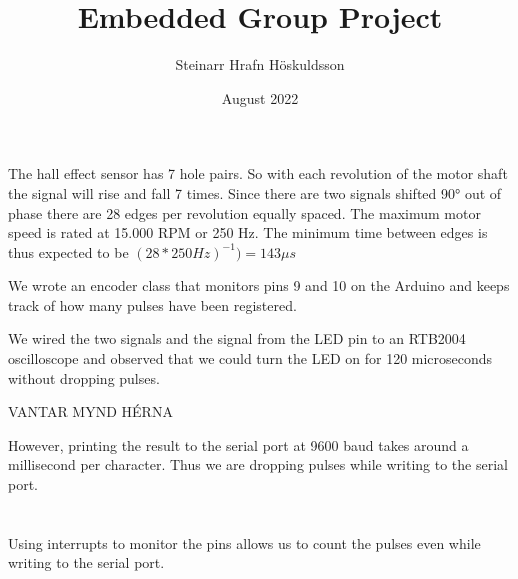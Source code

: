 \documentclass{article}
\title{Embedded Group Project}
\author{Steinarr Hrafn Höskuldsson}
\date{August 2022}
\begin{document}
\maketitle

\section{}
The hall effect sensor has 7 hole pairs. So with each revolution of the motor shaft the signal will rise and fall 7 times. Since there are two signals shifted 90° out of phase there are 28 edges per revolution equally spaced. The maximum motor speed is rated at 15.000 RPM or 250 Hz. The minimum time between edges is thus expected to be \((28*250Hz)^{-1}) = 143 \mu s\)

We wrote an encoder class that monitors pins 9 and 10 on the Arduino and keeps track of how many pulses have been registered. 

We wired the two signals and the signal from the LED pin to an RTB2004 oscilloscope and observed that we could turn the LED on for 120 microseconds without dropping pulses. 

VANTAR MYND HÉRNA

However, printing the result to the serial port at 9600 baud takes around a millisecond per character. Thus we are dropping pulses while writing to the serial port.


\section{}
Using interrupts to monitor the pins allows us to count the pulses even while writing to the serial port.
\end{document}
